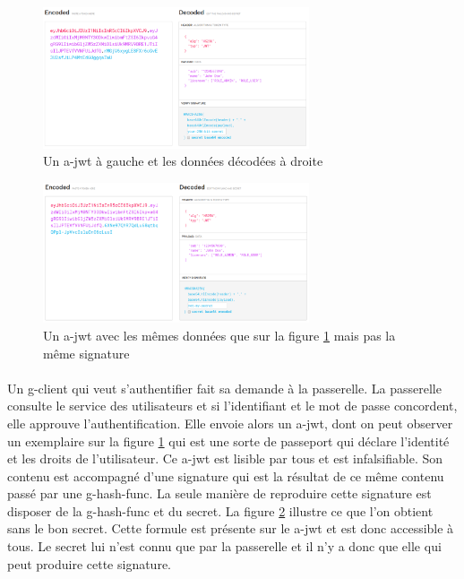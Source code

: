 \begin{figure}[h]
    \centering
    \includegraphics[width=0.7\textwidth]{images/screenshot/jwt-good-secret.png}
    \caption{Un \gls{a-jwt} à gauche et les données décodées à droite}
    \label{fig:jwt-good}
\end{figure}
\begin{figure}[h]
    \centering
    \includegraphics[width=0.7\textwidth]{images/screenshot/jwt-bad-secret.png}
    \caption{Un \gls{a-jwt} avec les mêmes données que sur la figure \ref{fig:jwt-good} mais pas la même signature}
    \label{fig:jwt-bad}
\end{figure}

\paragraph{}
Un \gls{g-client} qui veut s'authentifier fait sa demande à la passerelle.
La passerelle consulte le service des utilisateurs et si l'identifiant et le mot de passe concordent, elle approuve l'authentification.
Elle envoie alors un \gls{a-jwt}, dont on peut observer un exemplaire sur la figure \ref{fig:jwt-good} qui est une sorte de passeport qui déclare l'identité et les droits de l'utilisateur.
Ce \gls{a-jwt} est lisible par tous et est infalsifiable. Son contenu est accompagné d'une signature qui est la résultat de ce même contenu passé par une \gls{g-hash-func}.
La seule manière de reproduire cette signature est disposer de la \gls{g-hash-func} et du secret.
La figure \ref{fig:jwt-bad} illustre ce que l'on obtient sans le bon secret.
Cette formule est présente sur le \gls{a-jwt} et est donc accessible à tous.
Le secret lui n'est connu que par la passerelle et il n'y a donc que elle qui peut produire cette signature.

